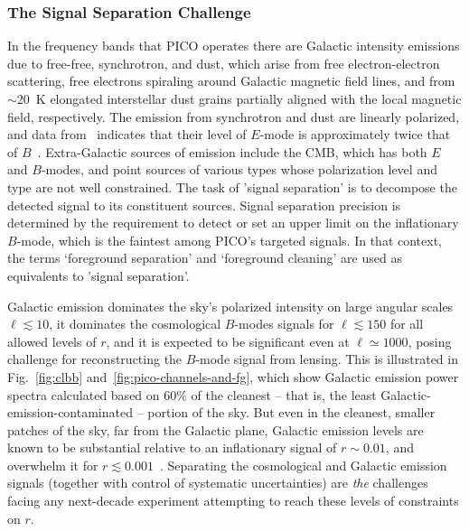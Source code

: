 \documentclass[PICOReport.tex]{subfiles}
\begin{document}

\subsubsection{The Signal Separation Challenge}
\label{sec:separation_challenge}

In the frequency bands that PICO operates there are Galactic intensity emissions due to free-free, synchrotron, and dust, which arise from free electron-electron scattering, free electrons spiraling around Galactic magnetic field lines, and from $\sim$20~K elongated interstellar dust grains partially aligned with the local magnetic field, respectively. The emission from synchrotron and dust are linearly polarized, and data from \planck\ indicates that their level of $E$-mode is approximately twice that of $B$~\cite{planckEB}. Extra-Galactic sources of emission include the CMB, which has both $E$ and $B$-modes, and point sources of various types whose polarization level and type are not well constrained. The task of 'signal separation' is to decompose the detected signal to its constituent sources. Signal separation precision is determined by the requirement to detect or set an upper limit on the inflationary $B$-mode, which is the faintest among PICO's targeted signals. In that context, the terms `foreground separation' and `foreground cleaning' are used as equivalents to 'signal separation'. 

Galactic emission dominates the sky's polarized intensity on large angular scales $\ell \lesssim 10$, it dominates the cosmological $B$-modes signals for $\ell \lesssim 150$ for all allowed levels of $r$, and it is expected to be significant even at $\ell \simeq 1000$, posing challenge for reconstructing the $B$-mode signal from lensing. This is illustrated in Fig.~\ref{fig:clbb} and~\ref{fig:pico-channels-and-fg}, which show Galactic emission power spectra calculated based on 60\% of the cleanest -- that is, the least Galactic-emission-contaminated -- portion of the sky. But even in the cleanest, smaller patches of the sky, far from the Galactic plane, Galactic emission levels are known to be substantial relative to an inflationary signal of $r \sim 0.01$, and overwhelm it for $r \lesssim0.001$~\cite{planckB}. Separating the cosmological and Galactic emission signals (together with control of systematic uncertainties) are {\it the} challenges facing any next-decade experiment attempting to reach these levels of constraints on $r$.
\end{document}
